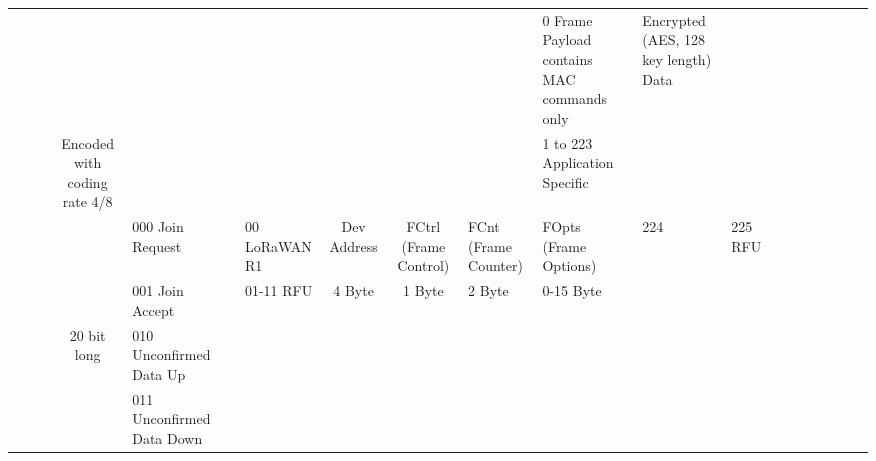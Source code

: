 \begin{table}[h!]
\begin{tabular}{llllllllllllllllllllllllll}
				&														&								&																		&																						&															&															&															&																											&														&																							&																		&																			&																																	&																																		&																	&	0	Frame Payload contains MAC commands only	&	Encrypted (AES, 128 key length) Data					&																&							&																\\
				&														&								&	\multicolumn{2}{c}{Encoded with coding rate 4/8}															&															&															&															&																											&														&																							&																		&																			&																																	&																																		&																	&	1 to 223	Application Specific							&																								&																&							&																\\
				&														&								&															 			&																						&	000	Join Request						&															&	00			LoRaWAN R1					&	\multicolumn{2}{c}{Dev Address}											&	\multicolumn{5}{c}{FCtrl (Frame Control)}																																																																																						&	FCnt (Frame Counter)																							&	FOpts (Frame Options)						&	224 & 225	RFU																&																								&																&							&																\\
				&														&								&															 			&																						&	001	Join Accept							&															&	01-11		RFU									&	\multicolumn{2}{c}{4 Byte}													&	\multicolumn{5}{c}{1 Byte}																																																																																													&	2 Byte																														&	0-15 Byte												&																							&																								&																&							&																\\
				&														&								&	\multicolumn{2}{c}{20 bit long}																								&	010	Unconfirmed Data Up			&															&															& 											&															&														&																							&																		&																			&																																	&																																		&																	&																							&																								&																&							&																\\
				&														&								&																		&																						&	011	Unconfirmed Data Down		&															&															&												&															&														&																							&																		&																			&																																	&																																		&																	&																							&																								&																&							&																\\

\end{tabular}
\end{table}
